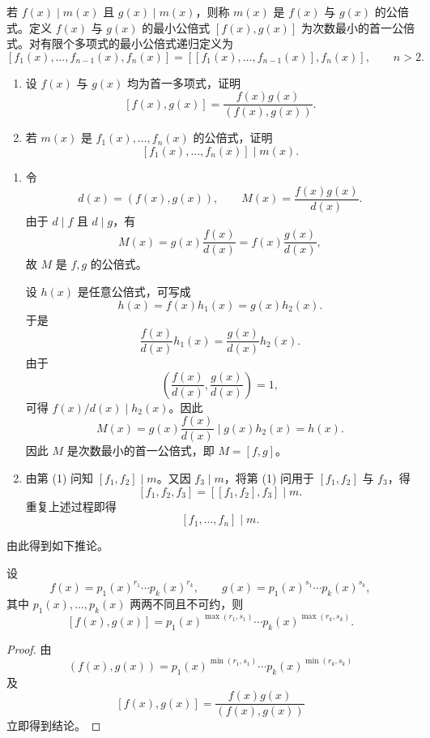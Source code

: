 \begin{problem}
若 \(f(x)\mid m(x)\) 且 \(g(x)\mid m(x)\)，则称 \(m(x)\) 是 \(f(x)\) 与 \(g(x)\) 的公倍式。定义 \(f(x)\) 与 \(g(x)\) 的最小公倍式 \([f(x),g(x)]\) 为次数最小的首一公倍式。对有限个多项式的最小公倍式递归定义为
	\[
	[f_1(x),\ldots,f_{n-1}(x),f_n(x)]
	=[[f_1(x),\ldots,f_{n-1}(x)],f_n(x)],
	\qquad n>2.
	\]
	\begin{enumerate}
		\item 设 \(f(x)\) 与 \(g(x)\) 均为首一多项式，证明
		\[
		[f(x),g(x)]=\frac{f(x)g(x)}{(f(x),g(x))}.
		\]
		\item 若 \(m(x)\) 是 \(f_1(x),\ldots,f_n(x)\) 的公倍式，证明
		\[
		[f_1(x),\ldots,f_n(x)]\mid m(x).
		\]
	\end{enumerate}
\end{problem}

\begin{solution}
	\begin{enumerate}
		\item 令
		\[
		d(x)=(f(x),g(x)),
		\qquad M(x)=\frac{f(x)g(x)}{d(x)}.
		\]
		由于 \(d\mid f\) 且 \(d\mid g\)，有
		\[
		M(x)=g(x)\frac{f(x)}{d(x)}=f(x)\frac{g(x)}{d(x)},
		\]
		故 \(M\) 是 \(f,g\) 的公倍式。
		
		设 \(h(x)\) 是任意公倍式，可写成
		\[
		h(x)=f(x)h_1(x)=g(x)h_2(x).
		\]
		于是
		\[
		\frac{f(x)}{d(x)}h_1(x)=\frac{g(x)}{d(x)}h_2(x).
		\]
		由于
		\[
		\left(\frac{f(x)}{d(x)},\frac{g(x)}{d(x)}\right)=1,
		\]
		可得 \(f(x)/d(x)\mid h_2(x)\)。因此
		\[
		M(x)=g(x)\frac{f(x)}{d(x)}\mid g(x)h_2(x)=h(x).
		\]
		因此 \(M\) 是次数最小的首一公倍式，即 \(M=[f,g]\)。
		
		\item 由第 (1) 问知 \([f_1,f_2]\mid m\)。又因 \(f_3\mid m\)，将第 (1) 问用于 \([f_1,f_2]\) 与 \(f_3\)，得
		\[
		[f_1,f_2,f_3]=[[f_1,f_2],f_3]\mid m.
		\]
		重复上述过程即得
		\[
		[f_1,\ldots,f_n]\mid m.
		\]
	\end{enumerate}
\end{solution}

由此得到如下推论。

\begin{corollary}
	设
	\[
	f(x)=p_1(x)^{r_1}\cdots p_k(x)^{r_k},
	\qquad
	g(x)=p_1(x)^{s_1}\cdots p_k(x)^{s_k},
	\]
	其中 \(p_1(x),\ldots,p_k(x)\) 两两不同且不可约，则
	\[
	[f(x),g(x)]
	=p_1(x)^{\max(r_1,s_1)}\cdots p_k(x)^{\max(r_k,s_k)}.
	\]
\end{corollary}

\begin{proof}
	由
	\[
	(f(x),g(x))
	=p_1(x)^{\min(r_1,s_1)}\cdots p_k(x)^{\min(r_k,s_k)}
	\]
	及
	\[
	[f(x),g(x)]=\frac{f(x)g(x)}{(f(x),g(x))}
	\]
	立即得到结论。
\end{proof}

